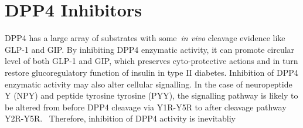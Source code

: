 \section{DPP4 Inhibitors}
DPP4 has a large array of substrates with some~\textit{in vivo} cleavage evidence like GLP-1 and GIP. By inhibiting DPP4 enzymatic activity, it can promote circular level of both GLP-1 and GIP, which preserves cyto-protective actions and in turn restore glucoregulatory function of insulin in type II diabetes. Inhibition of DPP4 enzymatic activity may also alter cellular signalling. In the case of neuropeptide Y (NPY) and peptide tyrosine tyrosine (PYY), the signalling pathway is likely to be altered from before DPP4 cleavage via Y1R-Y5R to after cleavage pathway Y2R-Y5R.~\cite{Mulvihill_2014} Therefore, inhibition of DPP4 activity is inevitabliy  